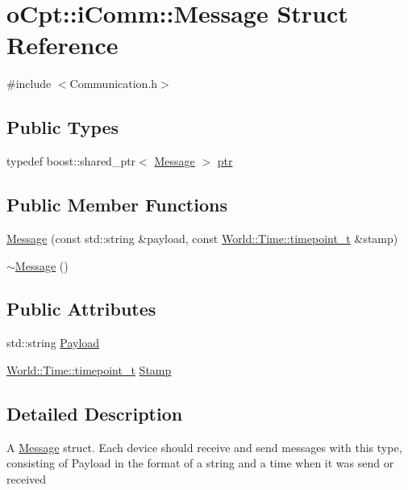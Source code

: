 \hypertarget{structo_cpt_1_1i_comm_1_1_message}{}\section{o\+Cpt\+:\+:i\+Comm\+:\+:Message Struct Reference}
\label{structo_cpt_1_1i_comm_1_1_message}


{\ttfamily \#include $<$Communication.\+h$>$}

\subsection*{Public Types}
\begin{DoxyCompactItemize}
\item 
typedef boost\+::shared\+\_\+ptr$<$ \hyperlink{structo_cpt_1_1i_comm_1_1_message}{Message} $>$ \hyperlink{structo_cpt_1_1i_comm_1_1_message_ad2ba828ad76f96a30e3898b2609a4c01}{ptr}
\end{DoxyCompactItemize}
\subsection*{Public Member Functions}
\begin{DoxyCompactItemize}
\item 
\hyperlink{structo_cpt_1_1i_comm_1_1_message_acabc9841f33a226d3670e524ef8f69c5}{Message} (const std\+::string \&payload, const \hyperlink{classo_cpt_1_1_world_1_1_time_a6a6e782c3c90622c1c7070b0a223ec4c}{World\+::\+Time\+::timepoint\+\_\+t} \&stamp)
\item 
\hyperlink{structo_cpt_1_1i_comm_1_1_message_a9f3e20489859c6ff3222f88234b1c93c}{$\sim$\+Message} ()
\end{DoxyCompactItemize}
\subsection*{Public Attributes}
\begin{DoxyCompactItemize}
\item 
std\+::string \hyperlink{structo_cpt_1_1i_comm_1_1_message_a46117baa6509fd31f7e8cb187cc3f8a9}{Payload}
\item 
\hyperlink{classo_cpt_1_1_world_1_1_time_a6a6e782c3c90622c1c7070b0a223ec4c}{World\+::\+Time\+::timepoint\+\_\+t} \hyperlink{structo_cpt_1_1i_comm_1_1_message_ad00181a6c0e5cc88b61f808c1638972f}{Stamp}
\end{DoxyCompactItemize}


\subsection{Detailed Description}
A \hyperlink{structo_cpt_1_1i_comm_1_1_message}{Message} struct. Each device should receive and send messages with this type, consisting of Payload in the format of a string and a time when it was send or received 

